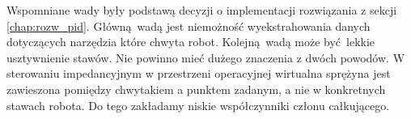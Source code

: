 Wspomniane wady były podstawą decyzji o implementacji rozwiązania z sekcji \ref{chap:rozw_pid}. Główną wadą jest niemożność wyekstrahowania danych dotyczących narzędzia które chwyta robot. Kolejną wadą może być lekkie usztywnienie stawów. Nie powinno mieć dużego znaczenia z dwóch powodów. W sterowaniu impedancyjnym w przestrzeni operacyjnej wirtualna sprężyna jest zawieszona pomiędzy chwytakiem a punktem zadanym, a nie w konkretnych stawach robota. Do tego zakładamy niskie współczynniki członu całkującego.








